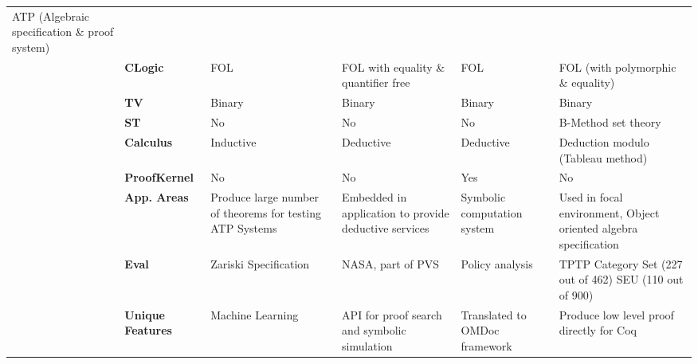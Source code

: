 \begin{table}[ht]
{{\begin{tabular}{|p{}|p{}|p{4cm}|p{4cm}|p{3.9cm}|p{4.57cm}|}
ATP ({\tiny Algebraic specification \& proof system})\\
 & \textbf{CLogic} & FOL & FOL with equality \& quantifier free & FOL & FOL (with polymorphic \& equality) \\
 & \textbf{TV} & Binary & Binary & Binary & Binary\\
 & \textbf{ST} & No & No & No & B-Method set theory\\
 & \textbf{Calculus} & Inductive & Deductive & Deductive & Deduction modulo (Tableau method)\\
 & \textbf{ProofKernel} & No & No & Yes & No \\ \hline
\parbox[t]{2mm}{} & \textbf{App. Areas} & Produce large number of theorems for 
        testing ATP Systems & Embedded in application to provide deductive services & 
	      Symbolic computation system & Used in focal environment, Object oriented algebra specification \\
 &\textbf{Eval}  & Zariski Specification & NASA, part of PVS & Policy analysis & TPTP Category Set (227 out of 462)
 SEU (110 out of 900) \\
 & \textbf{Unique Features} & Machine Learning  & API for proof search and symbolic simulation & Translated to OMDoc framework & Produce low 
            level proof directly for Coq\\
\hline
\end{tabular}
}
}
\label{ACL2}
\end{table}
